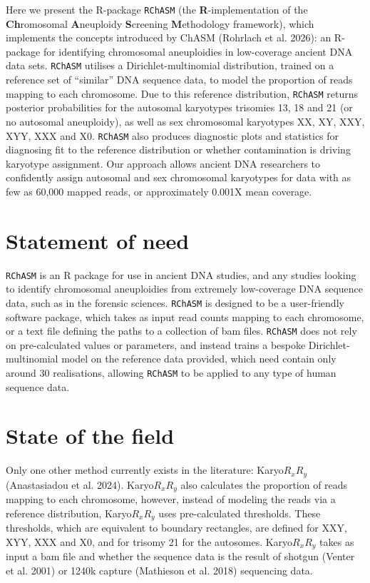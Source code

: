 \documentclass[
  letterpaper,
  DIV=11,
  numbers=noendperiod]{scrartcl}
\begin{document}
Here we present the R-package \texttt{RChASM} (the
\textbf{R}-implementation of the \textbf{Ch}romosomal
\textbf{A}neuploidy \textbf{S}creening \textbf{M}ethodology framework),
which implements the concepts introduced by ChASM (Rohrlach et al.
2026): an R-package for identifying chromosomal aneuploidies in
low-coverage ancient DNA data sets. \texttt{RChASM} utilises a
Dirichlet-multinomial distribution, trained on a reference set of
``similar'' DNA sequence data, to model the proportion of reads mapping
to each chromosome. Due to this reference distribution, \texttt{RChASM}
returns posterior probabilities for the autosomal karyotypes trisomies
13, 18 and 21 (or no autosomal aneuploidy), as well as sex chromosomal
karyotypes XX, XY, XXY, XYY, XXX and X0. \texttt{RChASM} also produces
diagnostic plots and statistics for diagnosing fit to the reference
distribution or whether contamination is driving karyotype assignment.
Our approach allows ancient DNA researchers to confidently assign
autosomal and sex chromosomal karyotypes for data with as few as 60,000
mapped reads, or approximately 0.001X mean coverage.

\section{Statement of need}\label{statement-of-need}

\texttt{RChASM} is an R package for use in ancient DNA studies, and any
studies looking to identify chromosomal aneuploidies from extremely
low-coverage DNA sequence data, such as in the forensic sciences.
\texttt{RChASM} is designed to be a user-friendly software package,
which takes as input read counts mapping to each chromosome, or a text
file defining the paths to a collection of bam files. \texttt{RChASM}
does not rely on pre-calculated values or parameters, and instead trains
a bespoke Dirichlet-multinomial model on the reference data provided,
which need contain only around 30 realisations, allowing \texttt{RChASM}
to be applied to any type of human sequence data.

\section{State of the field}\label{state-of-the-field}

Only one other method currently exists in the literature:
Karyo\(R_{x}R_{y}\) ({Anastasiadou et al.} 2024). Karyo\(R_{x}R_{y}\)
also calculates the proportion of reads mapping to each chromosome,
however, instead of modeling the reads via a reference distribution,
Karyo\(R_{x}R_{y}\) uses pre-calculated thresholds. These thresholds,
which are equivalent to boundary rectangles, are defined for XXY, XYY,
XXX and X0, and for trisomy 21 for the autosomes. Karyo\(R_{x}R_{y}\)
takes as input a bam file and whether the sequence data is the result of
shotgun ({Venter et al.} 2001) or 1240k capture ({Mathieson et al.}
2018) sequencing data.
\end{document}

